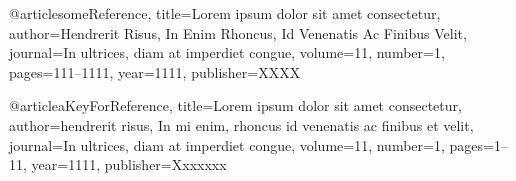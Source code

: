 @article{someReference,
  title={Lorem ipsum dolor sit amet consectetur},
  author={Hendrerit Risus, In Enim Rhoncus, Id Venenatis Ac Finibus Velit},
  journal={In ultrices, diam at imperdiet congue},
  volume={11},
  number={1},
  pages={111--1111},
  year={1111},
  publisher={XXXX}
}


@article{aKeyForReference,
  title={Lorem ipsum dolor sit amet consectetur},
  author={hendrerit risus, In mi enim, rhoncus id venenatis ac finibus et velit},
  journal={In ultrices, diam at imperdiet congue},
  volume={11},
  number={1},
  pages={1--11},
  year={1111},
  publisher={Xxxxxxx}
}